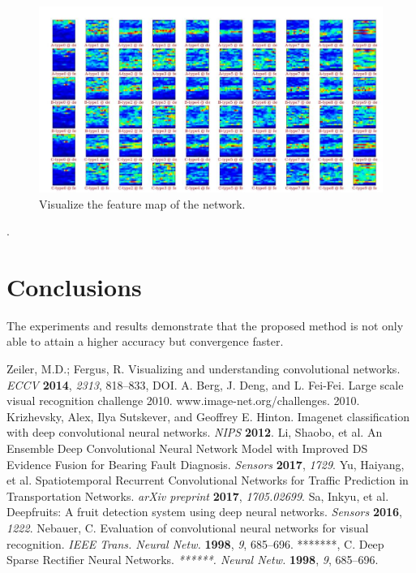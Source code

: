 \documentclass[sensors,article,submit,moreauthors,pdftex,10pt,a4paper]{mdpi}
\begin{document}
\begin{figure}[H]
	\centering
	\includegraphics[width=12 cm]{6.jpg}
	\caption{Visualize the feature map of the network.}
	\label{Scene-ComparedNet}
\end{figure}
.

\section{Conclusions}

The experiments and results demonstrate that the proposed method is not only able to attain a higher accuracy but convergence faster.

\begin{thebibliography}{999}
Zeiler, M.D.; Fergus, R. Visualizing and understanding convolutional networks. {\em ECCV} {\bf 2014}, {\em 2313}, 818--833, DOI.
A. Berg, J. Deng, and L. Fei-Fei. Large scale visual recognition challenge 2010. www.image-net.org/challenges. 2010.
Krizhevsky, Alex, Ilya Sutskever, and Geoffrey E. Hinton. Imagenet classification with deep convolutional neural networks. {\em NIPS} {\bf 2012}.
Li, Shaobo, et al. An Ensemble Deep Convolutional Neural Network Model with Improved DS Evidence Fusion for Bearing Fault Diagnosis. {\em Sensors} {\bf 2017}, {\em 1729}.
Yu, Haiyang, et al. Spatiotemporal Recurrent Convolutional Networks for Traffic Prediction in Transportation Networks. {\em arXiv preprint} {\bf 2017}, {\em 1705.02699}.
Sa, Inkyu, et al. Deepfruits: A fruit detection system using deep neural networks. {\em Sensors} {\bf 2016}, {\em 1222}.
Nebauer, C. Evaluation of convolutional neural networks for visual recognition. {\em IEEE Trans. Neural Netw.} {\bf 1998}, {\em 9}, 685–696.
*******, C. Deep Sparse Rectifier Neural Networks. {\em *******. Neural Netw.} {\bf 1998}, {\em 9}, 685–696.
\end{thebibliography}
\end{document}
